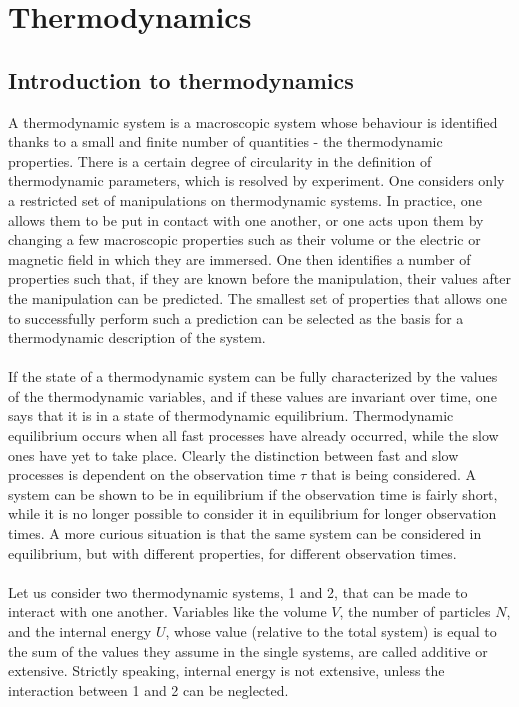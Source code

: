 \chapter{Thermodynamics}
\section{Introduction to thermodynamics}
A thermodynamic system is a macroscopic system whose behaviour is identified thanks to a small and finite number of quantities - the thermodynamic properties.
There is a certain degree of circularity in the definition of thermodynamic parameters, which is resolved by experiment. One considers only a restricted set of manipulations on thermodynamic systems. In practice, one allows them to be put in contact with one another, or one acts upon them by changing a few macroscopic properties such as their volume or the electric or magnetic field in which they are immersed. One then identifies a number of properties such that, if they are known before the manipulation, their values after the manipulation can be predicted. The smallest set of properties that allows one to successfully perform such a prediction can be selected as the basis for a thermodynamic description of the system.
\\ \\
If the state of a thermodynamic system can be fully characterized by the values of the thermodynamic variables, and if these values are invariant over time, one says that it is in a state of thermodynamic equilibrium. Thermodynamic equilibrium occurs when all fast processes have already occurred, while the slow ones have yet to take place. Clearly the distinction between fast and slow processes is dependent on the observation time $\tau$ that is being considered.
A system can be shown to be in equilibrium if the observation time is fairly short, while it is no longer possible to consider it in equilibrium for longer observation times. A more curious situation is that the same system can be considered in equilibrium, but with different properties, for different observation times.
\\ \\
Let us consider two thermodynamic systems, 1 and 2, that can be made to interact with one another. Variables like the volume $V$, the number of particles $N$, and the internal energy $U$, whose value (relative to the total system) is equal to the sum of the values they assume in the single systems, are called additive or extensive.
Strictly speaking, internal energy is not extensive, unless the interaction between 1 and 2 can be neglected.
